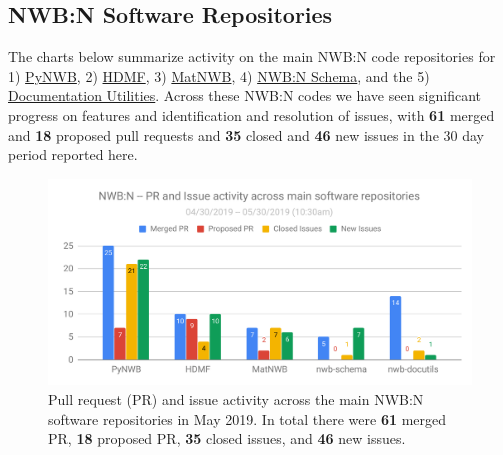 \documentclass{article}
\begin{document}
\subsection{NWB:N Software Repositories}

The charts below summarize activity on the main NWB:N code repositories for 1) \href{https://github.com/NeurodataWithoutBorders/pynwb}{PyNWB}, 2) \href{https://github.com/NeurodataWithoutBorders/pynwb}{HDMF}, 3) \href{https://github.com/NeurodataWithoutBorders/matnwb}{MatNWB}, 4) \href{https://github.com/NeurodataWithoutBorders/nwb-schema}{NWB:N Schema}, and the 5) \href{https://github.com/NeurodataWithoutBorders/nwb-docutils}{Documentation Utilities}. Across these NWB:N codes we have seen significant progress on features and identification and resolution of issues, with \textbf{61} merged and \textbf{18} proposed pull requests and \textbf{35} closed and \textbf{46} new issues in the 30 day period reported here.

\begin{figure}[h!]
  \begin{minipage}[c]{0.67\textwidth}
    \includegraphics[width=\textwidth]{figures/nwbn_activity_software_pr_issues.pdf}
  \end{minipage}\hfill
  \begin{minipage}[c]{0.3\textwidth}
    \caption*{Pull request (PR) and issue activity across the main NWB:N software repositories in May 2019. In total there were \textbf{61} merged PR, \textbf{18} proposed PR, \textbf{35} closed issues, and \textbf{46} new issues.} 
  \end{minipage}
  \vspace{-0.3cm}
\end{figure}
\end{document}
